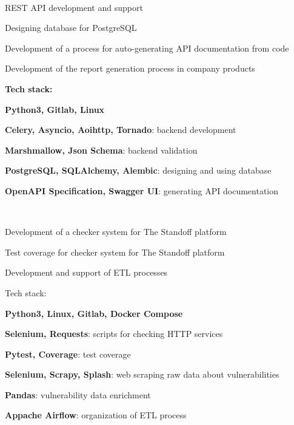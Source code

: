 \documentclass[a4paper]{MagicalCV}
\begin{document}
\hfill
\begin{minipage}[t]{0.66\textwidth} 


 \\
\vspace{\topsep} %
\begin{tightemize}
  \item REST API development and support
  \item Designing database for PostgreSQL
  \item Development of a process for auto-generating API documentation from code
  \item Development of the report generation process in company products
\end{tightemize}
\textbf{Tech stack:} 
\begin{tightemize}
  \item \textbf{Python3, Gitlab, Linux}
  \item \textbf{Celery, Asyncio, Aoihttp, Tornado}: backend development
  \item \textbf{Marshmallow, Json Schema}: backend validation
  \item \textbf{PostgreSQL, SQLAlchemy, Alembic}: designing and using database
  \item \textbf{OpenAPI Specification, Swagger UI}: generating API documentation
\end{tightemize}
\sectionsep

 \\
\vspace{\topsep} %
\begin{tightemize}
  \item Development of a checker system for The Standoff platform
  \item Test coverage for checker system for The Standoff platform
  \item Development and support of ETL processes
\end{tightemize}
Tech stack:
\begin{tightemize}
  \item \textbf{Python3, Linux, Gitlab, Docker Compose}
  \item \textbf{Selenium, Requests}: scripts for checking HTTP services
  \item \textbf{Pytest, Coverage}: test coverage
  \item \textbf{Selenium, Scrapy, Splash}: web scraping raw data about vulnerabilities
  \item \textbf{Pandas}: vulnerability data enrichment
  \item \textbf{Appache Airflow}: organization of ETL process
\end{tightemize}
\sectionsep


\end{minipage} 
\end{document}
